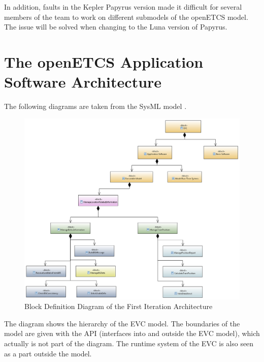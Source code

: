 \documentclass{template/openetcs_report}
\begin{document}
In addition, faults in the Kepler Papyrus version made it difficult for several members of the team to work on different submodels of the openETCS model. The issue will be solved when changing to the Luna version of Papyrus.

\section{The openETCS Application Software Architecture}


The following diagrams are taken from the SysML model \cite{sysml-model}.

\begin{figure}[h]
\centering
\includegraphics[scale=0.4]{../images/FunctionalArchitectureHigh.png}
\caption{Block Definition Diagram of the First Iteration Architecture}
\end{figure}

The diagram shows the hierarchy of the EVC model. The boundaries of the model are given with the API (interfaces into and outside the EVC model), which actually is not part of the diagram. The runtime system of the EVC is also seen as a part outside the model.
\end{document}
